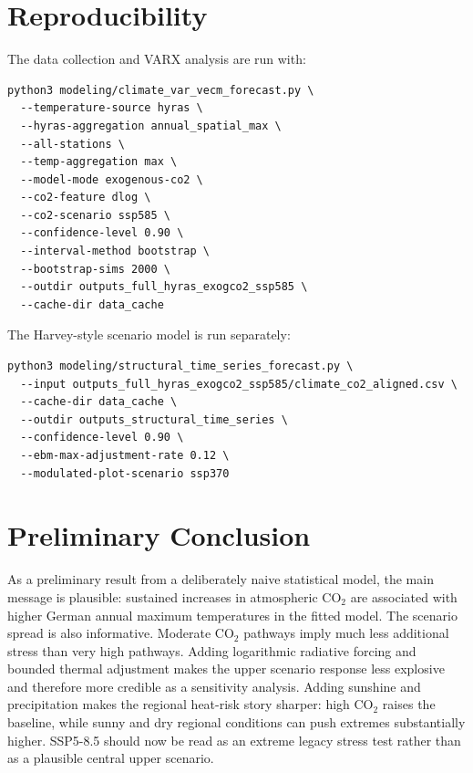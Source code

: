 \documentclass[11pt,a4paper]{article}
\begin{document}
\section{Reproducibility}

The data collection and VARX analysis are run with:
\begin{verbatim}
python3 modeling/climate_var_vecm_forecast.py \
  --temperature-source hyras \
  --hyras-aggregation annual_spatial_max \
  --all-stations \
  --temp-aggregation max \
  --model-mode exogenous-co2 \
  --co2-feature dlog \
  --co2-scenario ssp585 \
  --confidence-level 0.90 \
  --interval-method bootstrap \
  --bootstrap-sims 2000 \
  --outdir outputs_full_hyras_exogco2_ssp585 \
  --cache-dir data_cache
\end{verbatim}

The Harvey-style scenario model is run separately:
\begin{verbatim}
python3 modeling/structural_time_series_forecast.py \
  --input outputs_full_hyras_exogco2_ssp585/climate_co2_aligned.csv \
  --cache-dir data_cache \
  --outdir outputs_structural_time_series \
  --confidence-level 0.90 \
  --ebm-max-adjustment-rate 0.12 \
  --modulated-plot-scenario ssp370
\end{verbatim}

\section{Preliminary Conclusion}

As a preliminary result from a deliberately naive statistical model, the main
message is plausible: sustained increases in atmospheric CO$_2$ are associated
with higher German annual maximum temperatures in the fitted model. The scenario
spread is also informative. Moderate CO$_2$ pathways imply much less additional
stress than very high pathways. Adding logarithmic radiative forcing and bounded
thermal adjustment makes the upper scenario response less explosive and therefore
more credible as a sensitivity analysis. Adding sunshine and precipitation makes
the regional heat-risk story sharper: high CO$_2$ raises the baseline, while
sunny and dry regional conditions can push extremes substantially higher.
SSP5-8.5 should now be read as an extreme legacy stress test rather than as a
plausible central upper scenario.
\end{document}
